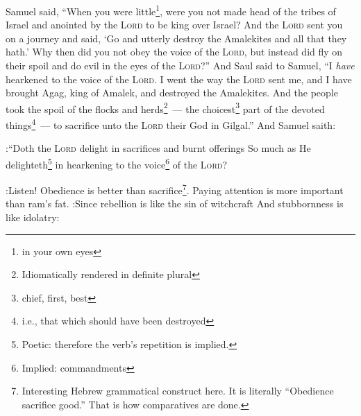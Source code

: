 \begin{inparaenum}
     Samuel said, ``When you were little\footnote{in your own eyes}, were you not made head of the tribes of Israel and anointed by the \textsc{Lord} to be king over Israel?%
     And the \textsc{Lord} sent you on a journey and said, `Go and utterly destroy the Amalekites and all that they hath.'%
     Why then did you not obey the voice of the \textsc{Lord}, but instead did fly on their spoil and do evil in the eyes of the \textsc{Lord}?''%
     And Saul said to Samuel, ``I \emph{have} hearkened to the voice of the \textsc{Lord}. I went the way the \textsc{Lord} sent me, and I have brought Agag, king of Amalek, and destroyed the Amalekites.%
     And the people took the spoil of the flocks and herds\footnote{Idiomatically rendered in definite plural}~--- the choicest\footnote{chief, first, best} part of the devoted things\footnote{i.e., that which should have been destroyed}~--- to sacrifice unto the \textsc{Lord} their God in Gilgal.''%
     And Samuel saith:
    
:``Doth the \textsc{Lord} delight in sacrifices and burnt offerings So much as He delighteth\footnote{Poetic: therefore the verb's repetition is implied.} in hearkening to the voice\footnote{Implied: commandments} of the \textsc{Lord}?

:Listen! Obedience is better than sacrifice\footnote{Interesting Hebrew grammatical construct here. It is literally ``Obedience sacrifice good.'' That is how comparatives are done.}. Paying attention is more important than ram's fat.%
     :Since rebellion is like the sin of witchcraft And stubbornness is like idolatry:


\end{inparaenum}
